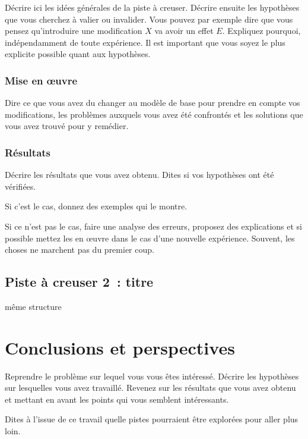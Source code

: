 \documentclass[a4paper]{article}
\begin{document}
Décrire ici les idées générales de la piste à creuser. Décrire ensuite les hypothèses que vous cherchez à valier ou invalider.
Vous pouvez par exemple dire que vous pensez qu'introduire une modification $X$ va avoir un effet $E$. Expliquez pourquoi, indépendamment de toute expérience.
Il est important que vous soyez le plus explicite possible quant aux hypothèses.
\subsubsection{Mise en \oe uvre}

Dire ce que vous avez du changer au modèle de base pour prendre en compte vos modifications, les problèmes auxquels vous avez été confrontés et les solutions que vous avez trouvé pour y remédier.

\subsubsection{Résultats}

Décrire les résultats que vous avez obtenu. Dites si vos hypothèses ont été vérifiées.

Si c'est le cas, donnez des exemples qui le montre.

Si ce n'est pas le cas, faire une analyse des erreurs, proposez des explications et si possible mettez les en \oe uvre dans le cas d'une nouvelle expérience. Souvent, les choses ne marchent pas du premier coup.

\subsection{Piste à creuser 2~: titre}

même structure


\section{Conclusions et perspectives}

Reprendre le problème sur lequel vous vous êtes intéressé. Décrire les hypothèses sur lesquelles vous avez travaillé. Revenez sur les résultats que vous avez obtenu et mettant en avant les points qui vous semblent intéressants.

Dites à l'issue de ce travail quelle pistes pourraient être explorées pour aller plus loin.
\end{document}
